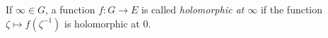 If $\infty \in G$, a function $f: G \rightarrow E$ is called \emph{holomorphic at $\infty$} if the function $\zeta \mapsto f(\zeta^{-1})$ is holomorphic at $0$.
